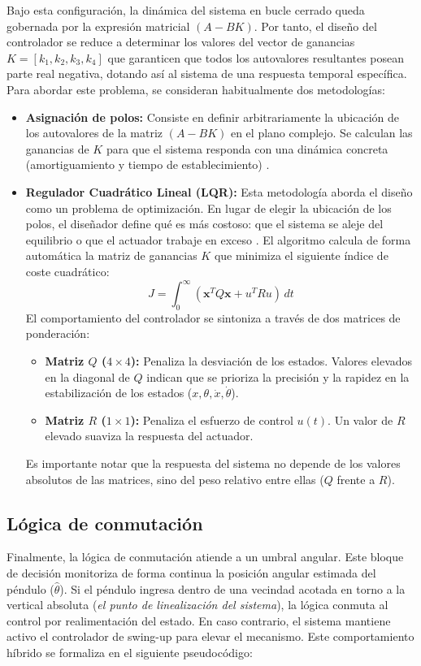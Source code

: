 \documentclass[11pt,fleqn]{book} %
\begin{document}
Bajo esta configuración, la dinámica del sistema en bucle cerrado queda gobernada por la expresión matricial $(A - BK)$. Por tanto, el diseño del controlador se reduce a determinar los valores del vector de ganancias $K = [k_1, k_2, k_3, k_4]$ que garanticen que todos los autovalores resultantes posean parte real negativa, dotando así al sistema de una respuesta temporal específica. Para abordar este problema, se consideran habitualmente dos metodologías:
\begin{itemize}
	\item \textbf{Asignación de polos:} Consiste en definir arbitrariamente la ubicación de los autovalores de la matriz $(A-BK)$ en el plano complejo. Se calculan las ganancias de $K$ para que el sistema responda con una dinámica concreta (amortiguamiento y tiempo de establecimiento) \cite{Penarrocha_Tema8}.
	\newpage
	\item \textbf{Regulador Cuadrático Lineal (LQR):} Esta metodología aborda el diseño como un problema de optimización. En lugar de elegir la ubicación de los polos, el diseñador define qué es más costoso: que el sistema se aleje del equilibrio o que el actuador trabaje en exceso \cite{Penarrocha_Tema8}. El algoritmo calcula de forma automática la matriz de ganancias $K$ que minimiza el siguiente índice de coste cuadrático:
	\begin{equation}
		J = \int_{0}^{\infty} (\mathbf{x}^T Q \mathbf{x} + u^T R u) \, dt
		\label{eq:indice_coste_lqr}
	\end{equation}
	El comportamiento del controlador se sintoniza a través de dos matrices de ponderación:
	\begin{itemize}
		\item \textbf{Matriz $Q$ ($4 \times 4$):} Penaliza la desviación de los estados. Valores elevados en la diagonal de $Q$ indican que se prioriza la precisión y la rapidez en la estabilización de los estados ($x, \theta, \dot{x}, \dot{\theta}$).
		\item \textbf{Matriz $R$ ($1 \times 1$):} Penaliza el esfuerzo de control $u(t)$. Un valor de $R$ elevado suaviza la respuesta del actuador.
	\end{itemize}
	Es importante notar que la respuesta del sistema no depende de los valores absolutos de las matrices, sino del peso relativo entre ellas ($Q$ frente a $R$). 
\end{itemize}
 
\subsection{Lógica de conmutación}
\label{cap:log_conmu}
Finalmente, la lógica de conmutación atiende a un umbral angular. Este bloque de decisión monitoriza de forma continua la posición angular estimada del péndulo ($\hat{\theta}$). Si el péndulo ingresa dentro de una vecindad acotada en torno a la vertical absoluta (\textit{el punto de linealización del sistema}), la lógica conmuta al control por realimentación del estado. En caso contrario, el sistema mantiene activo el controlador de swing-up para elevar el mecanismo. Este comportamiento híbrido se formaliza en el siguiente pseudocódigo:
\end{document}
